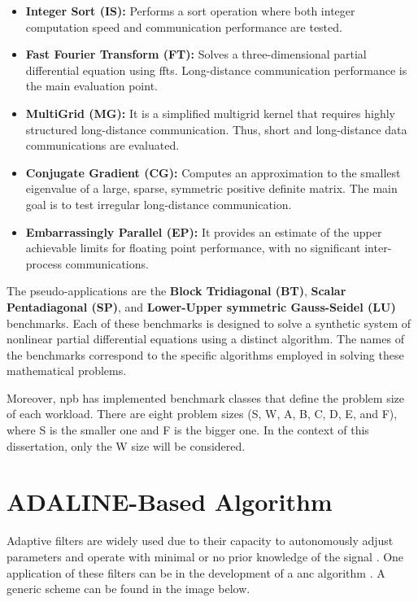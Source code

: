 \begin{itemize}
    \item \textbf{Integer Sort (IS):} Performs a sort operation where both integer computation speed and communication performance are tested.

    \item \textbf{Fast Fourier Transform (FT):} Solves a three-dimensional partial differential equation using \glspl{fft}. 
        Long-distance communication performance is the main evaluation point. 

    \item \textbf{MultiGrid (MG):} It is a simplified multigrid kernel that requires highly structured long-distance communication. Thus, short and 
        long-distance data communications are evaluated.

    \item \textbf{Conjugate Gradient (CG):} Computes an approximation to
    the smallest eigenvalue of a large, sparse, symmetric positive definite matrix. The main goal is to test irregular long-distance communication.

    \item \textbf{Embarrassingly Parallel (EP):} It provides an estimate of the
    upper achievable limits for floating point performance, with no significant inter-process communications.
\end{itemize}

The pseudo-applications are the \textbf{Block Tridiagonal (BT)}, \textbf{Scalar Pentadiagonal (SP)}, and 
\textbf{Lower-Upper symmetric Gauss-Seidel (LU)} benchmarks. Each of these benchmarks is designed to solve a synthetic system of nonlinear partial 
differential equations using a distinct algorithm. The names of the benchmarks correspond to the specific algorithms employed in solving these 
mathematical problems.

Moreover, \gls{npb} has implemented benchmark classes that define the problem size of each workload. There are eight problem 
sizes (S, W, A, B, C, D, E, and F), where S is the smaller one and F is the bigger one. In the context of this dissertation, only the W size 
will be considered.


\section{ADALINE-Based Algorithm}

Adaptive filters are widely used due to their capacity to autonomously adjust parameters and operate with minimal or no prior 
knowledge of the signal \cite{haykin1996linear}. One application of these filters can be in the development 
of a \gls{anc} algorithm \cite{noiseCancelingADALINE}. A generic scheme can be found in the image below.

